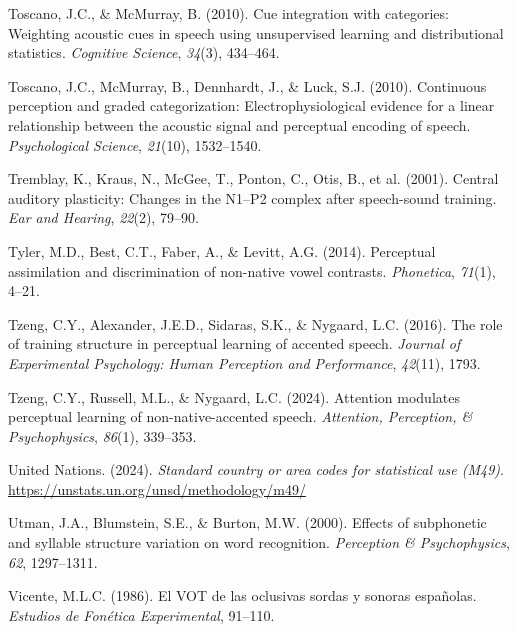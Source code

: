 \documentclass[
  12pt,
  twoside]{article}
\newlength{\cslhangindent}
\newlength{\cslentryspacingunit} %
\newenvironment{CSLReferences}[2] %
 {%
  \setlength{\parindent}{0pt}
  \ifodd #1
  \let\oldpar\par
  \def\par{\hangindent=\cslhangindent\oldpar}
  \fi
  \setlength{\parskip}{#2\cslentryspacingunit}
 }%
 {}
\begin{document}
\begin{CSLReferences}{1}{0}
\leavevmode{}%
Toscano, J.C., \& McMurray, B. (2010). Cue integration with categories: Weighting acoustic cues in speech using unsupervised learning and distributional statistics. \emph{Cognitive Science}, \emph{34}(3), 434--464.

\leavevmode{}%
Toscano, J.C., McMurray, B., Dennhardt, J., \& Luck, S.J. (2010). Continuous perception and graded categorization: Electrophysiological evidence for a linear relationship between the acoustic signal and perceptual encoding of speech. \emph{Psychological Science}, \emph{21}(10), 1532--1540.

\leavevmode{}%
Tremblay, K., Kraus, N., McGee, T., Ponton, C., Otis, B., et al. (2001). Central auditory plasticity: Changes in the {N1}--{P2} complex after speech-sound training. \emph{Ear and Hearing}, \emph{22}(2), 79--90.

\leavevmode{}%
Tyler, M.D., Best, C.T., Faber, A., \& Levitt, A.G. (2014). Perceptual assimilation and discrimination of non-native vowel contrasts. \emph{Phonetica}, \emph{71}(1), 4--21.

\leavevmode{}%
Tzeng, C.Y., Alexander, J.E.D., Sidaras, S.K., \& Nygaard, L.C. (2016). The role of training structure in perceptual learning of accented speech. \emph{Journal of Experimental Psychology: Human Perception and Performance}, \emph{42}(11), 1793.

\leavevmode{}%
Tzeng, C.Y., Russell, M.L., \& Nygaard, L.C. (2024). Attention modulates perceptual learning of non-native-accented speech. \emph{Attention, Perception, \& Psychophysics}, \emph{86}(1), 339--353.

\leavevmode{}%
United Nations. (2024). \emph{Standard country or area codes for statistical use (M49)}. \url{https://unstats.un.org/unsd/methodology/m49/}

\leavevmode{}%
Utman, J.A., Blumstein, S.E., \& Burton, M.W. (2000). Effects of subphonetic and syllable structure variation on word recognition. \emph{Perception \& Psychophysics}, \emph{62}, 1297--1311.

\leavevmode{}%
Vicente, M.L.C. (1986). El {VOT} de las oclusivas sordas y sonoras espa{ñ}olas. \emph{Estudios de Fon{é}tica Experimental}, 91--110.


\end{CSLReferences}
\end{document}
